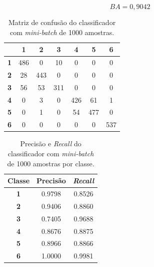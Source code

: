 \begin{equation}\label{eq:ba_lr_1000}
BA = 0,9042
\end{equation}

\begin{table}[H]
\centering
\begin{tabular}{c||c|c|c|c|c|c|}
	\cline{2-7}
	& \textbf{1} & \textbf{2} & \textbf{3} & \textbf{4} & \textbf{5} & \textbf{6} \\ \hline\hline
	\multicolumn{1}{|c||}{\textbf{1}} & 486        & 0          & 10         & 0          & 0          & 0          \\ \hline
	\multicolumn{1}{|c||}{\textbf{2}} & 28         & 443        & 0          & 0          & 0          & 0          \\ \hline
	\multicolumn{1}{|c||}{\textbf{3}} & 56         & 53         & 311        & 0          & 0          & 0          \\ \hline
	\multicolumn{1}{|c||}{\textbf{4}} & 0          & 3          & 0          & 426        & 61         & 1          \\ \hline
	\multicolumn{1}{|c||}{\textbf{5}} & 0          & 1          & 0          & 54         & 477        & 0          \\ \hline
	\multicolumn{1}{|c||}{\textbf{6}} & 0          & 0          & 0          & 0          & 0          & 537        \\ \hline
\end{tabular}
\caption{Matriz de confusão do classificador com \textit{mini-batch} de 1000 amostras.}
\label{tab:mc_lr_1000}
\end{table}

\begin{table}[H]
\centering
\begin{tabular}{c|c|c}
	\textbf{Classe} & \textbf{Precisão} & \textit{\textbf{Recall}} \\ \hline
	\textbf{1}      & 0.9798            & 0.8526                   \\
	\textbf{2}      & 0.9406            & 0.8860                   \\
	\textbf{3}      & 0.7405            & 0.9688                   \\
	\textbf{4}      & 0.8676            & 0.8875                   \\
	\textbf{5}      & 0.8966            & 0.8866                   \\
	\textbf{6}      & 1.0000            & 0.9981                  
\end{tabular}
\caption{Precisão e \textit{Recall} do classificador com \textit{mini-batch} de 1000 amostras por classe.}
\label{tab:pr_lr_1000}
\end{table}







